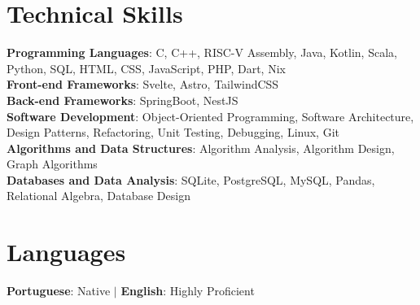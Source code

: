 \section{Technical Skills}
\begin{itemize}[leftmargin=0.15in, label={}]
    \small{
    \item{
        \textbf{Programming Languages}{: C, C++, RISC-V Assembly,
        Java, Kotlin, Scala, Python, SQL, HTML, CSS, JavaScript, PHP, Dart, Nix} \\
        \textbf{Front-end Frameworks}{: Svelte, Astro, TailwindCSS} \\
        \textbf{Back-end Frameworks}{: SpringBoot, NestJS} \\
        \textbf{Software Development}{: Object-Oriented Programming,
          Software Architecture, Design Patterns, Refactoring, Unit
        Testing, Debugging, Linux, Git} \\
        \textbf{Algorithms and Data Structures}{: Algorithm Analysis,
        Algorithm Design, Graph Algorithms} \\
        \textbf{Databases and Data Analysis}{: SQLite, PostgreSQL,
        MySQL, Pandas, Relational Algebra, Database Design}
    }}
\end{itemize}

\section{Languages}
\begin{itemize}[leftmargin=0.15in, label={}]
    \small{
    \item{
        \textbf{Portuguese}{: Native} $|$
        \textbf{English}{: Highly Proficient}
    }}
\end{itemize}


